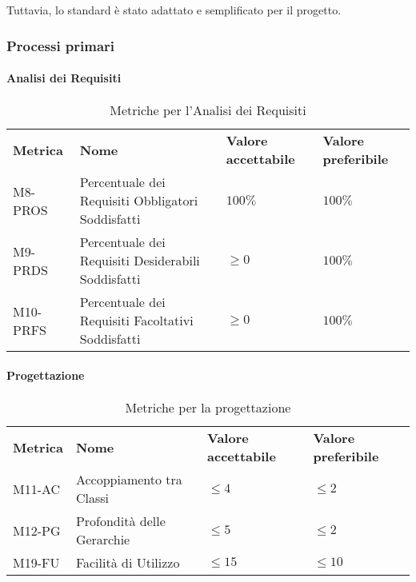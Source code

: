\noindent Tuttavia, lo standard è stato adattato e semplificato per il progetto.


\subsubsection{Processi primari} \label{processi primari}

\paragraph{Analisi dei Requisiti}

\begin{table}[h]
    \begin{adjustbox}{width=\textwidth}
    \centering
    \renewcommand{\arraystretch}{1.5}
    \begin{tabular}{>{\centering\arraybackslash} m{2cm} >{\centering\arraybackslash} m{6cm} >{\centering\arraybackslash} m{3cm} >{\centering\arraybackslash} m{3cm}}
    \rowcolor[HTML]{bfbfbf} 
    \textbf{Metrica} & \textbf{Nome} & \textbf{Valore accettabile} & \textbf{Valore preferibile} \\
    M8-PROS & Percentuale dei Requisiti Obbligatori Soddisfatti &  $100\%$ & $100\%$\\
    M9-PRDS & Percentuale dei Requisiti Desiderabili Soddisfatti & $\ge 0$ & $100\%$\\
    M10-PRFS & Percentuale dei Requisiti Facoltativi Soddisfatti &   $\ge 0$ & $100\%$\\
    \end{tabular}
    \end{adjustbox}
    \caption{Metriche per l'Analisi dei Requisiti}
\end{table}

\clearpage


\paragraph{Progettazione}

\begin{table}[h]
    \begin{adjustbox}{width=\textwidth}
    \centering
    \renewcommand{\arraystretch}{1.5}
    \begin{tabular}{>{\centering\arraybackslash} m{2cm} >{\centering\arraybackslash} m{6cm} >{\centering\arraybackslash} m{3cm} >{\centering\arraybackslash} m{3cm}}
    \rowcolor[HTML]{bfbfbf} 
    \textbf{Metrica} & \textbf{Nome} & \textbf{Valore accettabile} & \textbf{Valore preferibile} \\
    M11-AC & Accoppiamento tra Classi & $\le 4$ & $\le 2$ \\
    M12-PG & Profondità delle Gerarchie & $\le 5$ & $\le 2$\\
    M19-FU & Facilità di Utilizzo & $\le 15$ & $\le 10$ \\ 
    \end{tabular}
    \end{adjustbox}
    \caption{Metriche per la progettazione}
\end{table}


